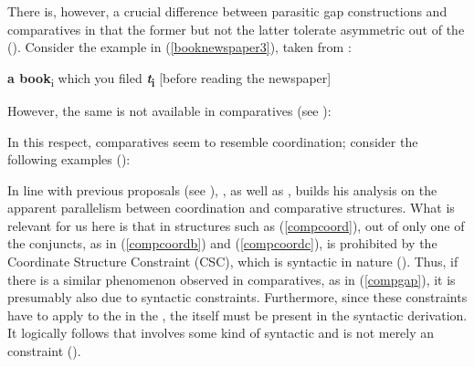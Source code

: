 There is, however, a crucial difference between parasitic gap constructions and comparatives in that the former but not the latter tolerate asymmetric  out of the  (\citealt[19]{lechner2004}). Consider the example in (\ref{booknewspaper3}), taken from \citet[19, ex. 37]{lechner2004}:

\ea \textbf{a book}\textsubscript{i} which you filed \textbf{\emph{t}\textsubscript{i}} [before reading the newspaper] \label{booknewspaper3}
\z

However, the same is not available in comparatives (see \citealt[19, ex. 38]{lechner2004}):

\ea \label{compgap}
\z
\z

In this respect, comparatives seem to resemble coordination; consider the following examples (\citealt[19, exx. 39--40]{lechner2004}):

\ea \label{compcoord}
 \label{compcoordb}
 \label{compcoordc}
\z
\z

In line with previous proposals (see \citealt{pinkham1982diss, napoli1983, mccawley1988, moltmann1992diss, corver1993}), \citet{lechner2004}, as well as \citet{lechner1999diss}, builds his analysis on the apparent parallelism between coordination and comparative structures. What is relevant for us here is that in structures such as (\ref{compcoord}),  out of only one of the conjuncts, as in (\ref{compcoordb}) and (\ref{compcoordc}), is prohibited by the Coordinate Structure Constraint (CSC), which is syntactic in nature (\citealt[19--20]{lechner2004}). Thus, if there is a similar phenomenon observed in comparatives, as in (\ref{compgap}), it is presumably also due to syntactic constraints. Furthermore, since these constraints have to apply to the  in the , the  itself must be present in the syntactic derivation. It logically follows that  involves some kind of syntactic  and is not merely an  constraint (\citealt[21]{lechner2004}).

